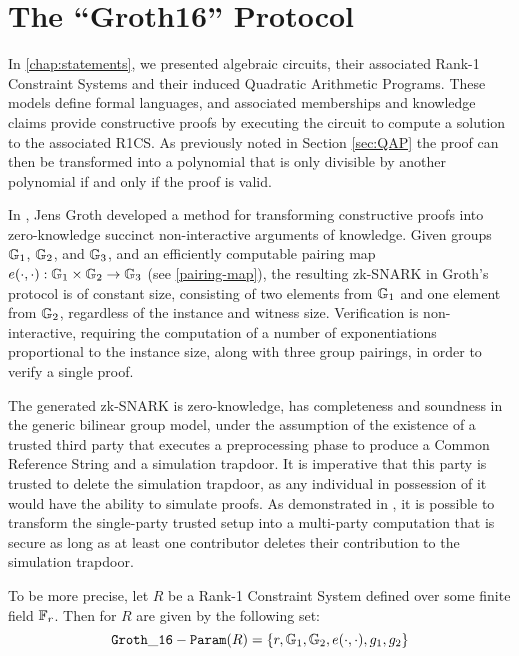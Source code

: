 \section{The ``Groth16'' Protocol}
\label{sec:gorth_16}
 In \chaptname{} \ref{chap:statements}, we presented algebraic circuits, their associated Rank-1 Constraint Systems and their induced Quadratic Arithmetic Programs. These models define formal languages, and associated memberships and knowledge claims provide constructive proofs by executing the circuit to compute a solution to the associated R1CS. As previously noted in Section \ref{sec:QAP} the proof can then be transformed into a polynomial that is only divisible by another polynomial if and only if the proof is valid. 
 
In \cite{Groth16}, Jens Groth developed a method for transforming constructive proofs into zero-knowledge succinct non-interactive arguments of knowledge. Given groups $\mathbb{G}_1$, $\mathbb{G}_2$, and $\mathbb{G}_3$, and an efficiently computable pairing map $e(\cdot,\cdot): \mathbb{G}_1 \times \mathbb{G}_2 \to \mathbb{G}_3$ (see \ref{pairing-map}), the resulting zk-SNARK in Groth's protocol is of constant size, consisting of two elements from $\mathbb{G}_1$ and one element from $\mathbb{G}_2$, regardless of the instance and witness size. Verification is non-interactive, requiring the computation of a number of exponentiations proportional to the instance size, along with three group pairings, in order to verify a single proof.

The generated zk-SNARK is zero-knowledge, has completeness and soundness in the generic bilinear group model, under the assumption of the existence of a trusted third party that executes a preprocessing phase to produce a Common Reference String and a simulation trapdoor. It is imperative that this party is trusted to delete the simulation trapdoor, as any individual in possession of it would have the ability to simulate proofs. As demonstrated in \cite{bowe-17}, it is possible to transform the single-party trusted setup into a multi-party computation that is secure as long as at least one contributor deletes their contribution to the simulation trapdoor. 

To be more precise, let $R$ be a Rank-1 Constraint System defined over some finite field $\mathbb{F}_r$. Then  for $R$ are given by the following set:
\begin{equation}
\label{groth16-parameters}
\mathtt{Groth\_16-Param}(R)= \{ r, \mathbb{G}_1, \mathbb{G}_2, e(\cdot,\cdot), g_1,g_2 \}
\end{equation}

